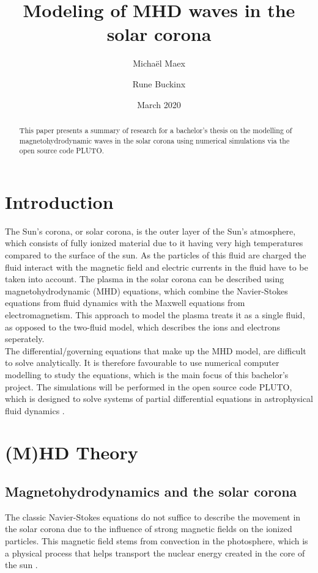 \documentclass{article}
\title{Modeling of MHD waves in the solar corona}
\author{Micha\"el Maex \and Rune Buckinx}
\date{March 2020}
\begin{document}
\maketitle

\begin{abstract}
    This paper presents a summary of research for a bachelor's thesis on the modelling of magnetohydrodynamic waves in the solar corona using numerical simulations via the open source code PLUTO. 
\end{abstract}
\tableofcontents

\listoftodos

\newpage
\section{Introduction} \label{sec:introduction}
The Sun's corona, or solar corona, is the outer layer of the Sun's atmosphere, which consists of fully ionized material due to it having very high temperatures compared to the surface of the sun. 
As the particles of this fluid are charged the fluid interact with the magnetic field and electric currents in the fluid have to be taken into account.  
The plasma in the solar corona can be described using magnetohydrodynamic (MHD) equations, which combine the Navier-Stokes equations from fluid dynamics with the Maxwell equations from electromagnetism. 
This approach to model the plasma treats it as a single fluid, as opposed to the two-fluid model, which describes the ions and electrons seperately. \\

The differential/governing equations that make up the MHD model, are difficult to solve analytically. 
It is therefore favourable to use numerical computer modelling to study the equations, which is the main focus of this bachelor's project. 
The simulations will be performed in the open source code PLUTO, which is designed to solve systems of partial differential equations in astrophysical fluid dynamics \cite{mignone2011pluto}. 

\section{(M)HD Theory} \label{sec:(m)hd_theory}

\subsection{Magnetohydrodynamics and the solar corona} \label{sec:magnetohydrodynamics_and_the_solar_corona}
The classic Navier-Stokes equations do not suffice to describe the movement in the solar corona due to the influence of strong magnetic fields on the ionized particles. This magnetic field stems from convection in the photosphere, which is a physical process that helps transport the nuclear energy created in the core of the sun \cite{brun2017magnetism}.\\
\end{document}
